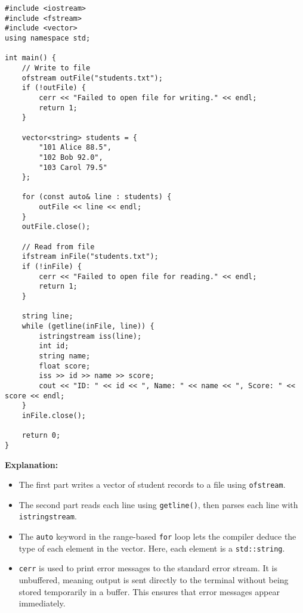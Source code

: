 \documentclass{article}
\begin{document}
\begin{lstlisting}[style=cppstyle]
#include <iostream>
#include <fstream>
#include <vector>
using namespace std;

int main() {
    // Write to file
    ofstream outFile("students.txt");
    if (!outFile) {
        cerr << "Failed to open file for writing." << endl;
        return 1;
    }

    vector<string> students = {
        "101 Alice 88.5",
        "102 Bob 92.0",
        "103 Carol 79.5"
    };

    for (const auto& line : students) {
        outFile << line << endl;
    }
    outFile.close();

    // Read from file
    ifstream inFile("students.txt");
    if (!inFile) {
        cerr << "Failed to open file for reading." << endl;
        return 1;
    }

    string line;
    while (getline(inFile, line)) {
        istringstream iss(line);
        int id;
        string name;
        float score;
        iss >> id >> name >> score;
        cout << "ID: " << id << ", Name: " << name << ", Score: " << score << endl;
    }
    inFile.close();

    return 0;
}
\end{lstlisting}

\textbf{Explanation:} 
\begin{itemize}
  \item The first part writes a vector of student records to a file using \texttt{ofstream}.
  \item The second part reads each line using \texttt{getline()}, then parses each line with \texttt{istringstream}.
  \item The \texttt{auto} keyword in the range-based \texttt{for} loop lets the compiler deduce the type of each element in the vector. Here, each element is a \texttt{std::string}.
  \item \texttt{cerr} is used to print error messages to the standard error stream. It is unbuffered, meaning output is sent directly to the terminal without being stored temporarily in a buffer. This ensures that error messages appear immediately.
\end{itemize}
\end{document}
